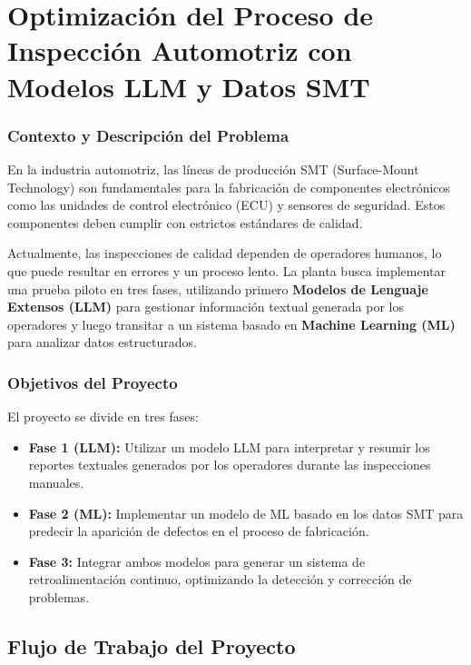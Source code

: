 \section{Optimización del Proceso de Inspección Automotriz con Modelos LLM y Datos SMT}

\subsubsection{Contexto y Descripción del Problema}

En la industria automotriz, las líneas de producción SMT (Surface-Mount Technology) son fundamentales para la fabricación de componentes electrónicos como las unidades de control electrónico (ECU) y sensores de seguridad. Estos componentes deben cumplir con estrictos estándares de calidad.

Actualmente, las inspecciones de calidad dependen de operadores humanos, lo que puede resultar en errores y un proceso lento. La planta busca implementar una prueba piloto en tres fases, utilizando primero \textbf{Modelos de Lenguaje Extensos (LLM)} para gestionar información textual generada por los operadores y luego transitar a un sistema basado en \textbf{Machine Learning (ML)} para analizar datos estructurados.

\subsubsection{Objetivos del Proyecto}

El proyecto se divide en tres fases:

\begin{itemize}
    \item \textbf{Fase 1 (LLM):} Utilizar un modelo LLM para interpretar y resumir los reportes textuales generados por los operadores durante las inspecciones manuales.
    \item \textbf{Fase 2 (ML):} Implementar un modelo de ML basado en los datos SMT para predecir la aparición de defectos en el proceso de fabricación.
    \item \textbf{Fase 3:} Integrar ambos modelos para generar un sistema de retroalimentación continuo, optimizando la detección y corrección de problemas.
\end{itemize}

\subsection{Flujo de Trabajo del Proyecto}

